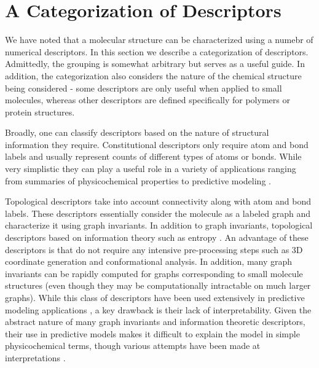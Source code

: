 \documentclass[letterpaper, 12pt]{article}
\begin{document}
\section{A Categorization of Descriptors}
\label{sec:categ-descr}

We have noted that a molecular structure can be characterized using a
numebr of numerical descriptors. In this section we describe a
categorization of descriptors. Admittedly, the grouping is somewhat
arbitrary but serves as a useful guide. In addition, the
categorization also considers the nature of the chemical structure
being considered - some descriptors are only useful when applied to
small molecules, whereas other descriptors are defined specifically
for polymers or protein structures.

Broadly, one can classify descriptors based on the nature of
structural information they require. Constitutional descriptors only
require atom and bond labels and usually represent counts of different
types of atoms or bonds. While very simplistic they can play a useful
role in a variety of applications ranging from summaries of
physicochemical properties to predictive modeling
\cite{Bender:2005aa}.  

Topological descriptors take into account connectivity along with atom
and bond labels. These descriptors essentially consider the molecule
as a labeled graph and characterize it using graph invariants. In
addition to graph invariants, topological descriptors based on
information theory such as entropy \cite{Dehmer:2009uq}. An advantage
of these descriptors is that do not require any intensive
pre-processing steps such as 3D coordinate generation and
conformational analysis. In addition, many graph invariants can be
rapidly computed for graphs corresponding to small molecule structures
(even though they may be computationally intractable on much larger
graphs). While this class of descriptors have been used extensively in
predictive modeling applications
\cite{Garcia-Domenech:2008aa,Randic:2001ad,Besalu:2001aa},
a key drawback is their lack of interpretability. Given the abstract
nature of many graph invariants and information theoretic descriptors,
their use in predictive models makes it difficult to explain the model
in simple physicochemical terms, though various attempts have been  
made at interpretations \cite{Todeschini:1975dq,Stanton:2003aa}.
\end{document}
